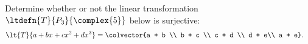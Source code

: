 Determine whether or not the linear transformation $\ltdefn{T}{P_3}{\complex{5}}$ below is surjective: 
%
\begin{align*}
\lt{T}{a + bx + cx^2 + dx^3} &= \colvector{a + b \\ b + c \\ c + d \\ d + e\\ a + e}.
\end{align*}
%